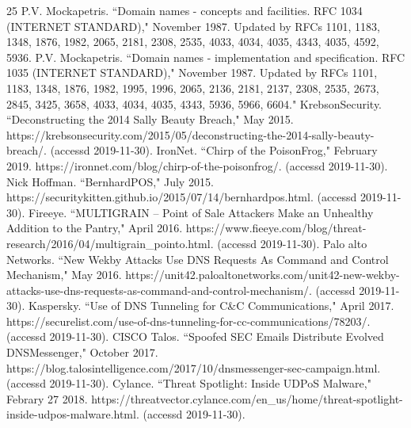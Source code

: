 \documentclass[12pt]{jarticle} %
\begin{document}
\newpage
%
\begin{thebibliography} {25}\small
  P.V. Mockapetris. ``Domain names - concepts and facilities. RFC 1034 (INTERNET STANDARD)," November 1987. Updated by RFCs 1101, 1183, 1348, 1876, 1982, 2065, 2181, 2308, 2535, 4033, 4034, 4035, 4343, 4035, 4592, 5936.
  P.V. Mockapetris. ``Domain names - implementation and specification. RFC 1035 (INTERNET STANDARD)," November 1987. Updated by RFCs 1101, 1183, 1348, 1876, 1982, 1995, 1996, 2065, 2136, 2181, 2137, 2308, 2535, 2673, 2845, 3425, 3658, 4033, 4034, 4035, 4343, 5936, 5966, 6604."
  KrebsonSecurity. ``Deconstructing the 2014 Sally Beauty Breach," May 2015. https://krebsonsecurity.com/2015/05/deconstructing-the-2014-sally-beauty-breach/. (accessd 2019-11-30).
  IronNet. ``Chirp of the PoisonFrog," February 2019. https://ironnet.com/blog/chirp-of-the-poisonfrog/. (accessd 2019-11-30).
  Nick Hoffman. ``BernhardPOS," July 2015. https://securitykitten.github.io/2015/07/14/bernhardpos.html. (accessd 2019-11-30).
  Fireeye. ``MULTIGRAIN – Point of Sale Attackers Make an Unhealthy Addition to the Pantry," April 2016. https://www.fieeye.com/blog/threat-research/2016/04/multigrain\_pointo.html. (accessd 2019-11-30).
  Palo alto Networks. ``New Wekby Attacks Use DNS Requests As Command and Control Mechanism," May 2016. https://unit42.paloaltonetworks.com/unit42-new-wekby-attacks-use-dns-requests-as-command-and-control-mechanism/. (accessd 2019-11-30).
  Kaspersky. ``Use of DNS Tunneling for C\&C Communications," April 2017. https://securelist.com/use-of-dns-tunneling-for-cc-communications/78203/. (accessd 2019-11-30).
  CISCO Talos. ``Spoofed SEC Emails Distribute Evolved DNSMessenger," October 2017. https://blog.talosintelligence.com/2017/10/dnsmessenger-sec-campaign.html. (accessd 2019-11-30).
  Cylance. ``Threat Spotlight: Inside UDPoS Malware," Febrary 27 2018. https://threatvector.cylance.com/en\_us/home/threat-spotlight-inside-udpos-malware.html. (accessd 2019-11-30).
\end{thebibliography}





\appendix
\end{document}
